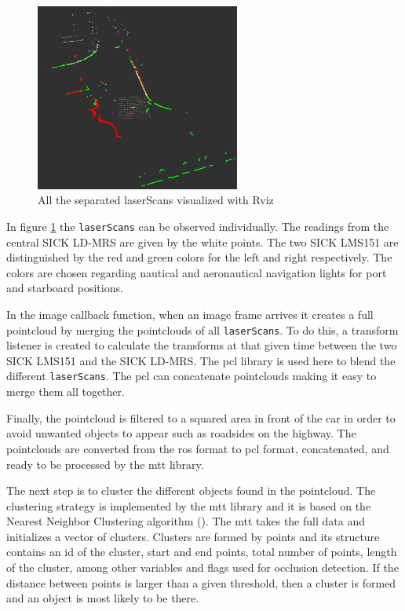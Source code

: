 \begin{figure}[htp]
	
	\centering
	\includegraphics[width=0.6\textwidth]{caplabel/imgs/rviz0.png}
	
	\caption{All the separated laserScans visualized with Rviz}
	\label{fig:rviz0}
	
\end{figure}

In figure \ref{fig:rviz0} the \texttt{laserScans} can be observed individually. The readings from the central SICK LD-MRS are given by the white points. The two SICK LMS151 are distinguished by the red and green colors for the left and right respectively. The colors are chosen regarding nautical and aeronautical navigation lights for port and starboard positions.

In the image callback function, when an image frame arrives it creates a full pointcloud by merging the pointclouds of all \texttt{laserScans}. To do this, a transform listener is created to calculate the transforms at that given time between the two SICK LMS151 and the SICK LD-MRS. The \gls{pcl} library is used here to blend the different \texttt{laserScans}. The \gls{pcl} can concatenate pointclouds making it easy to merge them all together.

Finally, the pointcloud is filtered to a squared area in front of the car in order to avoid unwanted objects to appear such as roadsides on the highway. The pointclouds are converted from the \gls{ros} format to \gls{pcl} format, concatenated, and ready to be processed by the \gls{mtt} library. 

The next step is to cluster the different objects found in the pointcloud. The clustering strategy is implemented by the \gls{mtt} library and it is based on the Nearest Neighbor Clustering algorithm (\cite{Yu2018}). The \gls{mtt} takes the full data and initializes a vector of clusters. Clusters are formed by points and its structure contains an id of the cluster, start and end points, total number of points, length of the cluster, among other variables and flags used for occlusion detection. If the distance between points is larger than a given threshold, then a cluster is formed and an object is most likely to be there.

